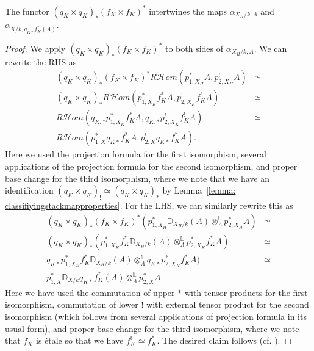 \documentclass[letterpaper,11pt]{amsart}
\begin{document}
\begin{lemma}\label{lem:ULA intertwine}
The functor $(q_K \times q_K)_\ast (f_K \times f_K)^\ast$ intertwines the maps $\alpha_{X_H/k,A}$ and $\alpha_{X/k,q_{K*}f_{K}^{*}(A)}$.
\end{lemma}
\begin{proof}
We apply $(q_{K} \times q_{K})_{\ast} (f_{K} \times f_{K})^{*}$ to both sides of $\alpha_{X_{H}/k,A}$. We can rewrite the RHS as 
\begin{align*} 
(q_{K} \times q_{K})_{*}(f_{K} \times f_{K})^{*}R\mathcal{H}om(p_{1,X_{H}}^\ast A, p_{2,X_{H}}^! A) &\simeq \\
 (q_{K} \times q_{K})_{*}R\mathcal{H}om(p_{1,X_{K}}^{\ast}f_{K}^{*}A, p_{2,X_{K}}^{!}f_{K}^{!}A) & \simeq \\
R\mathcal{H}om(q_{K,*}p_{1,X_{K}}^{\ast}f_{K}^{*}A, q_{K,*}p_{2,X_{K}}^{!}f_{K}^{!}A) &\simeq \\
R\mathcal{H}om(p_{1,X}^*q_{K*}f_{K}^{*}A, p_{2,X}^!q_{K*}f_{K}^{*}A).
\end{align*}
Here we used the projection formula \cite[Proposition~23.3 (2)]{Ecod} for the first isomorphism, several applications of the projection formula \cite[Proposition~23.3 (1)]{Ecod} for the second isomorphism, and proper base change for the third isomorphism, where we note that we have an identification $(q_{K} \times q_{K})_{!} \simeq (q_{K} \times q_{K})_{*}$ by Lemma~\ref{lemma: classifiyingstackmapproperties}. For the LHS, we can similarly rewrite this as 
\begin{align*} 
(q_{K} \times q_{K})_{*}(f_{K} \times f_{K})^{*}(p_{1,X_{H}}^\ast \mathbb{D}_{X_H/k}(A)\otimes^\mathbb{L}_\Lambda p_{2,X_{H}}^\ast A) & \simeq \\
(q_{K} \times q_{K})_{*}(p_{1,X_{K}}^{*}f_{K}^{*}\mathbb{D}_{X_H/k}(A)\otimes^\mathbb{L}_\Lambda p_{2,X_{K}}^*f_{K}^{*}A) & \simeq \\
q_{K*}p_{1,X_{K}}^{*}f_{K}^{*}\mathbb{D}_{X_H/k}(A)\otimes^\mathbb{L}_\Lambda q_{K*}p_{2,X_{K}}^*f_{K}^{*}A)
& \simeq  \\
p_{1,X}^\ast \mathbb{D}_{X/k}q_{K*}f_{K}^{*}(A) \otimes^\mathbb{L}_\Lambda p_{2,X}^\ast A.
\end{align*}
Here we have used the commutation of upper $*$ with tensor products for the first isomorphism, commutation of lower $!$ with external tensor product for the second isomorphism (which follows from several applications of projection formula in its usual form), and proper base-change for the third isomorphism, where we note that $f_{K}$ is \'etale so that we have $f_{K}^{!} \simeq f_{K}^{*}$. The desired claim follows (cf. \cite[Proposition~IV.2.28]{FSGeomLLC}).
\end{proof}
\end{document}
